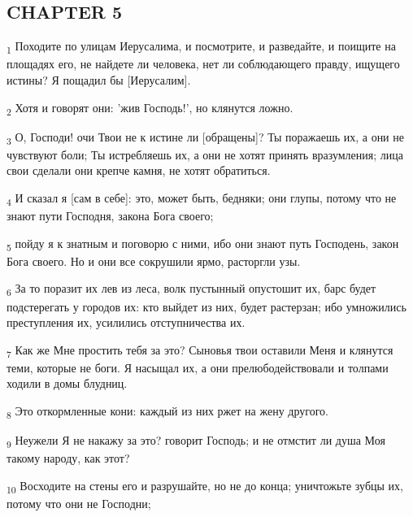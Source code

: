 \subsection{CHAPTER 5}
\begin{tcolorbox}
\textsubscript{1} Походите по улицам Иерусалима, и посмотрите, и разведайте, и поищите на площадях его, не найдете ли человека, нет ли соблюдающего правду, ищущего истины? Я пощадил бы [Иерусалим].
\end{tcolorbox}
\begin{tcolorbox}
\textsubscript{2} Хотя и говорят они: 'жив Господь!', но клянутся ложно.
\end{tcolorbox}
\begin{tcolorbox}
\textsubscript{3} О, Господи! очи Твои не к истине ли [обращены]? Ты поражаешь их, а они не чувствуют боли; Ты истребляешь их, а они не хотят принять вразумления; лица свои сделали они крепче камня, не хотят обратиться.
\end{tcolorbox}
\begin{tcolorbox}
\textsubscript{4} И сказал я [сам в себе]: это, может быть, бедняки; они глупы, потому что не знают пути Господня, закона Бога своего;
\end{tcolorbox}
\begin{tcolorbox}
\textsubscript{5} пойду я к знатным и поговорю с ними, ибо они знают путь Господень, закон Бога своего. Но и они все сокрушили ярмо, расторгли узы.
\end{tcolorbox}
\begin{tcolorbox}
\textsubscript{6} За то поразит их лев из леса, волк пустынный опустошит их, барс будет подстерегать у городов их: кто выйдет из них, будет растерзан; ибо умножились преступления их, усилились отступничества их.
\end{tcolorbox}
\begin{tcolorbox}
\textsubscript{7} Как же Мне простить тебя за это? Сыновья твои оставили Меня и клянутся теми, которые не боги. Я насыщал их, а они прелюбодействовали и толпами ходили в домы блудниц.
\end{tcolorbox}
\begin{tcolorbox}
\textsubscript{8} Это откормленные кони: каждый из них ржет на жену другого.
\end{tcolorbox}
\begin{tcolorbox}
\textsubscript{9} Неужели Я не накажу за это? говорит Господь; и не отмстит ли душа Моя такому народу, как этот?
\end{tcolorbox}
\begin{tcolorbox}
\textsubscript{10} Восходите на стены его и разрушайте, но не до конца; уничтожьте зубцы их, потому что они не Господни;
\end{tcolorbox}
